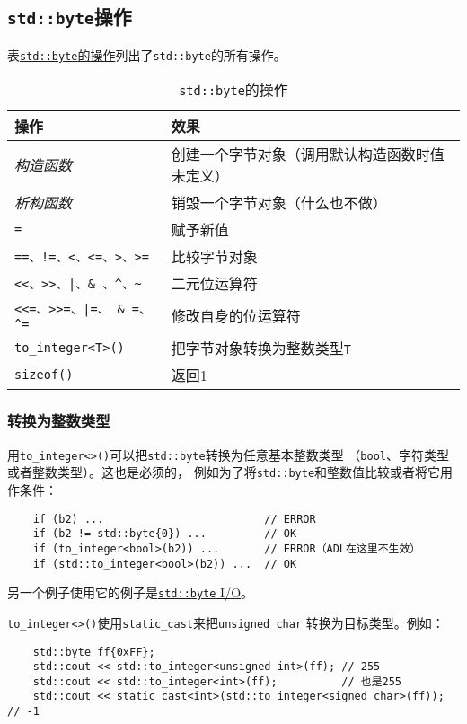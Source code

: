 \subsection{\texttt{std::byte}操作}
表\hyperref[t18.1]{\texttt{std::byte}的操作}列出了\texttt{std::byte}的所有操作。
\begin{table}[ht]
    \begin{tabular}{l|p{}}
        \hline
        \textbf{操作} & \textbf{效果} \\
        \hline
        \emph{构造函数} & 创建一个字节对象（调用默认构造函数时值未定义） \\
        \emph{析构函数} & 销毁一个字节对象（什么也不做） \\
        \texttt{=} & 赋予新值 \\
        \texttt{==、!=、<、<=、>、>=} & 比较字节对象 \\
        \texttt{<<、>>、|、\& 、\textasciicircum、\textasciitilde} & 二元位运算符    \\
        \texttt{<<=、>>=、|=、 \& =、\textasciicircum =}              & 修改自身的位运算符 \\
        \texttt{to\_integer<T>()} & 把字节对象转换为整数类型\texttt{T} \\
        \texttt{sizeof()} & 返回1 \\
        \hline
    \end{tabular}
    \caption{\texttt{std::byte}的操作}
    \label{t18.1}
\end{table}

\subsubsection{转换为整数类型}
用\texttt{to\_integer<>()}可以把\texttt{std::byte}转换为任意基本整数类型
（\texttt{bool}、字符类型或者整数类型）。这也是必须的，
例如为了将\texttt{std::byte}和整数值比较或者将它用作条件：
\begin{lstlisting}
    if (b2) ...                         // ERROR
    if (b2 != std::byte{0}) ...         // OK
    if (to_integer<bool>(b2)) ...       // ERROR（ADL在这里不生效）
    if (std::to_integer<bool>(b2)) ...  // OK
\end{lstlisting}
另一个例子使用它的例子是\hyperref[ch18.2.2.2]{\texttt{std::byte} I/O}。

\texttt{to\_integer<>()}使用\texttt{static\_cast}来把\texttt{unsigned char}
转换为目标类型。例如：
\begin{lstlisting}
    std::byte ff{0xFF};
    std::cout << std::to_integer<unsigned int>(ff); // 255
    std::cout << std::to_integer<int>(ff);          // 也是255
    std::cout << static_cast<int>(std::to_integer<signed char>(ff)); // -1
\end{lstlisting}


